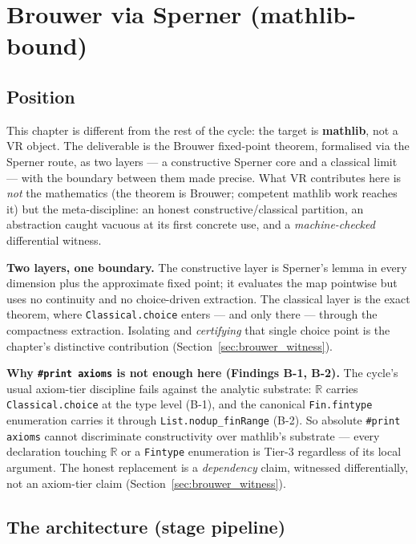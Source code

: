 \chapter{Brouwer via Sperner (mathlib-bound)}
\label{chap:brouwer}

\section{Position}
\label{sec:brouwer_position}

This chapter is different from the rest of the cycle: the target is \textbf{mathlib},
not a VR object.  The deliverable is the Brouwer fixed-point theorem, formalised via
the Sperner route, as two layers --- a constructive Sperner core and a classical
limit --- with the boundary between them made precise.  What VR contributes here is
\emph{not} the mathematics (the theorem is Brouwer; competent mathlib work reaches
it) but the meta-discipline: an honest constructive/classical partition, an
abstraction caught vacuous at its first concrete use, and a \emph{machine-checked}
differential witness.

\textbf{Two layers, one boundary.}  The constructive layer is Sperner's lemma in
every dimension plus the approximate fixed point; it evaluates the map pointwise but
uses no continuity and no choice-driven extraction.  The classical layer is the exact
theorem, where \texttt{Classical.choice} enters --- and only there --- through the
compactness extraction.  Isolating and \emph{certifying} that single choice point is
the chapter's distinctive contribution (Section~\ref{sec:brouwer_witness}).

\textbf{Why \texttt{\#print axioms} is not enough here (Findings B-1, B-2).}  The
cycle's usual axiom-tier discipline fails against the analytic substrate: $\mathbb{R}$
carries \texttt{Classical.choice} at the type level (B-1), and the canonical
\texttt{Fin.fintype} enumeration carries it through \texttt{List.nodup\_finRange}
(B-2).  So absolute \texttt{\#print axioms} cannot discriminate constructivity over
mathlib's substrate --- every declaration touching $\mathbb{R}$ or a \texttt{Fintype}
enumeration is Tier-3 regardless of its local argument.  The honest replacement is a
\emph{dependency} claim, witnessed differentially, not an axiom-tier claim
(Section~\ref{sec:brouwer_witness}).

\section{The architecture (stage pipeline)}
\label{sec:brouwer_pipeline}

